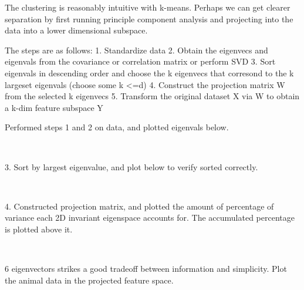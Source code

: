 \documentclass{article} %
\begin{document}
The clustering is reasonably intuitive with k-means. Perhaps we can get clearer separation by first running principle component analysis and projecting into the data into a lower dimensional subspace.

The steps are as follows:
 1. Standardize data 
 2. Obtain the eigenvecs and eigenvals from the covariance or correlation matrix or perform SVD
 3. Sort eigenvals in descending order and choose the k eigenvecs that corresond to the k largeset eigenvals (choose some k \textless{}=d) 
 4. Construct the projection matrix W from the selected k eigenvecs 
 5. Transform the original dataset X via W to obtain a k-dim feature subspace Y

Performed steps 1 and 2 on data, and plotted eigenvals below.

    \begin{center}
    \end{center}
    { \hspace*{\fill} \\}

3. Sort by largest eigenvalue, and plot below to verify sorted correctly.

    \begin{center}
    \end{center}
    { \hspace*{\fill} \\}

4. Constructed projection matrix, and plotted the amount of percentage of variance each 2D invariant eigenspace accounts for.
 The accumulated percentage is plotted above it.
 

    \begin{center}
    \end{center}
    { \hspace*{\fill} \\}

6 eigenvectors strikes a good tradeoff between information and simplicity.
Plot the animal data in the projected feature space.

    \begin{center}
    \end{center}
    { \hspace*{\fill} \\}
\end{document}
